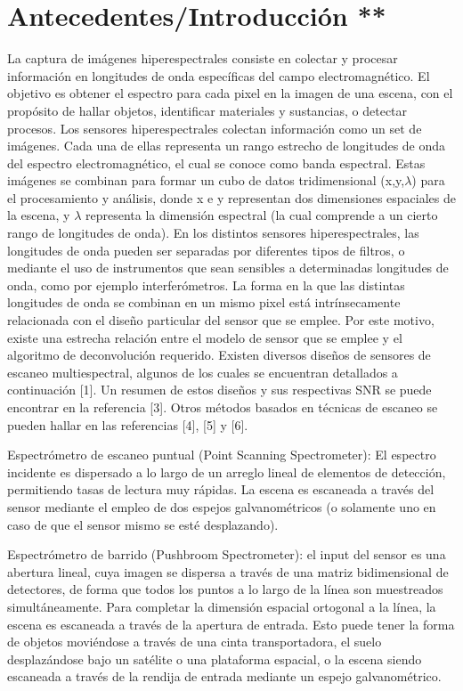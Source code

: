 \documentclass{ctuthesis}
\begin{document}
\section*{Antecedentes/Introducción **}
La captura de imágenes hiperespectrales consiste en colectar y procesar 
información en longitudes de onda específicas del campo electromagnético. El 
objetivo es obtener el espectro para cada pixel en la imagen de una escena, con 
el propósito de hallar objetos, identificar materiales y sustancias, o detectar 
procesos.
Los sensores hiperespectrales colectan información como un  set de imágenes. Cada una de ellas representa un rango estrecho de longitudes de onda del espectro electromagnético, el cual se conoce como banda espectral. Estas imágenes se combinan para formar un cubo de datos tridimensional (x,y,$\lambda$) para el procesamiento y análisis, donde x e y representan dos dimensiones espaciales de la escena, y $\lambda$ representa la dimensión espectral (la cual comprende a un cierto rango de longitudes de onda).
En los distintos sensores hiperespectrales, las longitudes de onda pueden ser separadas por diferentes tipos de filtros, o mediante el uso de instrumentos que sean sensibles a determinadas longitudes de onda, como por ejemplo interferómetros. La forma en la que las distintas longitudes de onda se combinan en un mismo pixel está intrínsecamente relacionada con el diseño particular del sensor que se emplee. Por este motivo, existe una estrecha relación entre el modelo de sensor que se emplee y el algoritmo de deconvolución requerido. Existen diversos diseños de sensores de escaneo multiespectral, algunos de los cuales se encuentran detallados a continuación [1]. Un resumen de estos diseños y sus respectivas SNR se puede encontrar en la referencia [3]. Otros métodos basados en técnicas de escaneo se pueden hallar en las referencias [4], [5] y  [6]. 

Espectrómetro de escaneo puntual (Point Scanning Spectrometer): El espectro incidente es dispersado a lo largo de un arreglo lineal de elementos de detección, permitiendo tasas de lectura muy rápidas. La escena es escaneada  a través del sensor mediante el empleo de dos espejos galvanométricos (o solamente uno en caso de que el sensor mismo se esté desplazando).

Espectrómetro de barrido (Pushbroom Spectrometer): el input del sensor es una abertura lineal, cuya imagen se dispersa a través de una matriz bidimensional de detectores, de forma que todos los puntos a lo largo de la línea son muestreados simultáneamente. Para completar la dimensión espacial ortogonal a la línea, la escena es escaneada a través de la apertura de entrada. Esto puede tener la forma de objetos moviéndose a través de una cinta transportadora, el suelo desplazándose bajo un satélite o una plataforma espacial, o la escena siendo escaneada a través de la rendija de entrada mediante un espejo galvanométrico.
\end{document}
